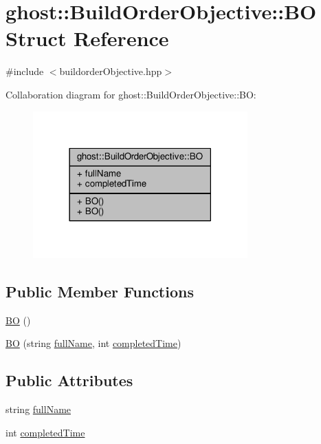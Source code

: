 \hypertarget{structghost_1_1BuildOrderObjective_1_1BO}{\section{ghost\-:\-:Build\-Order\-Objective\-:\-:B\-O Struct Reference}
\label{structghost_1_1BuildOrderObjective_1_1BO}
}


{\ttfamily \#include $<$buildorder\-Objective.\-hpp$>$}



Collaboration diagram for ghost\-:\-:Build\-Order\-Objective\-:\-:B\-O\-:
\nopagebreak
\begin{figure}[H]
\begin{center}
\leavevmode
\includegraphics[width=234pt]{structghost_1_1BuildOrderObjective_1_1BO__coll__graph}
\end{center}
\end{figure}
\subsection*{Public Member Functions}
\begin{DoxyCompactItemize}
\item 
\hyperlink{structghost_1_1BuildOrderObjective_1_1BO_ae412993ce70ea08514148f73f5e58cc4}{B\-O} ()
\item 
\hyperlink{structghost_1_1BuildOrderObjective_1_1BO_a8901530ad70062087732a1b5954b10b7}{B\-O} (string \hyperlink{structghost_1_1BuildOrderObjective_1_1BO_ae7a6f92b372f83aca41c2e71b338a88c}{full\-Name}, int \hyperlink{structghost_1_1BuildOrderObjective_1_1BO_ac61b9122d2757d44ba08984665eda144}{completed\-Time})
\end{DoxyCompactItemize}
\subsection*{Public Attributes}
\begin{DoxyCompactItemize}
\item 
string \hyperlink{structghost_1_1BuildOrderObjective_1_1BO_ae7a6f92b372f83aca41c2e71b338a88c}{full\-Name}
\item 
int \hyperlink{structghost_1_1BuildOrderObjective_1_1BO_ac61b9122d2757d44ba08984665eda144}{completed\-Time}
\end{DoxyCompactItemize}


